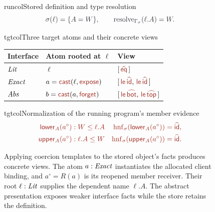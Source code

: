 \begin{figure}[!htbp]
\begin{examplepanel}{runcol}{Stored definition and type resolution}
\[
 \run{\sigma(\ell)=\{A=W\},\qquad
       \operatorname{resolve}_{\Gamma_\sigma}(\ell.A)=W.}
\]
\end{examplepanel}
\begin{examplepanel}{tgtcol}{Three target atoms and their concrete views}
\small
\renewcommand{\arraystretch}{1.35}
\begin{tabularx}{\linewidth}{@{}l >{\raggedright\arraybackslash}X l@{}}
\toprule
Interface & Atom rooted at \(\ell\) & View\\
\midrule
$\mathit{Lit}$ & $\ell$ & $[\,\form{eq}\,]$\\
$\mathit{Exact}$ & $a=\cast{\ell}{\ev{expose}}$
 & $[\,\ev{le}\,\form{id},\,\ev{le}\,\form{id}\,]$\\
$\mathit{Abs}$ & $b=\cast{a}{\ev{forget}}$
 & $[\,\ev{le}\,\form{bot},\,\ev{le}\,\form{top}\,]$\\
\bottomrule
\end{tabularx}
\end{examplepanel}
\begin{examplepanel}{tgtcol}{Normalization of the running program's member evidence}
\[
\tgt{\begin{aligned}
 \ev{lower}_A(a^\circ)&:W\le \ell.A
     &\hnf{\ev{lower}_A(a^\circ)}&=\form{id},\\
 \ev{upper}_A(a^\circ)&:\ell.A\le W
     &\hnf{\ev{upper}_A(a^\circ)}&=\form{id}.
\end{aligned}}
\]
\end{examplepanel}
\caption{Applying coercion templates to the stored object's facts
produces concrete views. The atom \(a:\mathit{Exact}\) instantiates the
allocated client binding, and $a^\circ=R(a)$ is its reopened
member receiver. Their root \(\ell:\mathit{Lit}\) supplies the dependent
name \(\ell.A\). The abstract presentation exposes weaker interface facts
while the store retains the definition.}
\label{fig:presentations}
\end{figure}
